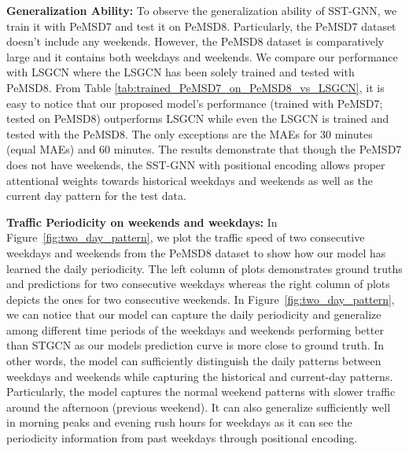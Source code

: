 \documentclass[runningheads]{llncs}
\begin{document}
\noindent
\textbf{Generalization Ability:}
To observe the generalization ability of SST-GNN, we train it with PeMSD7 and test it on PeMSD8. Particularly, the  PeMSD7 dataset doesn't include any weekends. However, the PeMSD8 dataset is comparatively large and it contains both weekdays and weekends. We compare our performance with LSGCN where the LSGCN has been solely trained and tested with PeMSD8. From Table \ref{tab:trained_PeMSD7_on_PeMSD8_vs_LSGCN}, it is easy to notice that our proposed model's performance (trained with  PeMSD7; tested on PeMSD8)  outperforms  LSGCN while even the LSGCN is trained and tested with the PeMSD8. The only exceptions are the MAEs for 30 minutes (equal MAEs) and 60 minutes. The results demonstrate that though the PeMSD7 does not have weekends, the SST-GNN with positional encoding allows proper attentional weights towards historical weekdays and weekends as well as the current day pattern for the test data.
\begin{figure*}[!t]
\centering
{}
\caption{Different periodic daily patterns on weekdays and weekends on PeMSD8. On the left, we can see speed decreases in morning peak and evening rush hours on weekdays whereas different traffic patterns are present on weekends.}
\label{fig:two_day_pattern}
\end{figure*}



\noindent
\textbf{Traffic Periodicity  on weekends and weekdays:}
In Figure~\ref{fig:two_day_pattern}, we plot the traffic speed of two consecutive weekdays and weekends from the PeMSD8 dataset to show how our model has learned the daily periodicity. The left column of plots demonstrates ground truths and predictions for two consecutive weekdays whereas the right column of plots depicts the ones for two consecutive weekends. In Figure~\ref{fig:two_day_pattern}, we can notice that our model can capture the daily periodicity and generalize among different time periods of the weekdays and weekends performing better than STGCN as our models prediction curve is more close to ground truth. In other words, the model can sufficiently distinguish the daily patterns between weekdays and weekends while capturing the historical and current-day patterns. Particularly,  the model captures the normal weekend patterns with slower traffic around the afternoon (previous weekend). It can also generalize sufficiently well in morning peaks and evening rush hours for weekdays as it can see the periodicity information from past weekdays through positional encoding.
\end{document}
